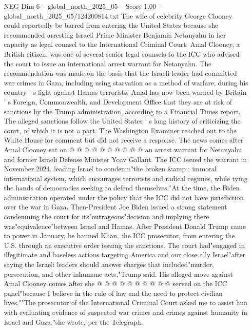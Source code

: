 \begin{textsample}{NEG Dim 6 – global\_north\_2025\_05 – Score 1.00 – global\_north\_2025\_05/124200814.txt}  \label{ex:f6_neg_381}
The wife of celebrity George Clooney could reportedly be barred from entering the United States because she recommended arresting Israeli Prime Minister Benjamin Netanyahu in her capacity as legal counsel to the International Criminal Court.
Amal Clooney, a British citizen, was one of several senior legal counsels to the ICC who advised the court to issue an international arrest warrant for Netanyahu.
The recommendation was made on the basis that the Israeli leader had committed war crimes in Gaza, including using starvation as a method of warfare, during his country ' s fight against Hamas terrorists.
Amal has now been warned by Britain ' s Foreign, Commonwealth, and Development Office that they are at risk of sanctions by the Trump administration, according to a Financial Times report.
The alleged sanctions follow the United States ' s long history of criticizing the court, of which it is not a part.
The Washington Examiner reached out to the White House for comment but did not receive a response.
The news comes after Amal Clooney sat on @ @ @ @ @ @ @ @ @ @ an arrest warrant for Netanyahu and former Israeli Defense Minister Yoav Gallant.
The ICC issued the warrant in November 2024, leading Israel to condemn"the broken \&amp ; immoral international system, which encourages terrorists and radical regimes, while tying the hands of democracies seeking to defend themselves."At the time, the Biden administration operated under the policy that the ICC did not have jurisdiction over the war in Gaza.
Then-President Joe Biden issued a strong statement condemning the court for its"outrageous"decision and implying there was"equivalence"between Israel and Hamas.
After President Donald Trump came to power in January, he banned Khan, the ICC prosecutor, from entering the U.S. through an executive order issuing the sanctions.
The court had"engaged in illegitimate and baseless actions targeting America and our close ally Israel"after saying the Israeli leaders should answer charges that included"murder, persecution, and other inhumane acts,"Trump said.
His alleged move against Amal Clooney comes after she @ @ @ @ @ @ @ @ @ @ served on the ICC panel"because I believe in the rule of law and the need to protect civilian lives.""The prosecutor of the International Criminal Court asked me to assist him with evaluating evidence of suspected war crimes and crimes against humanity in Israel and Gaza,"she wrote, per the Telegraph.

\end{textsample}
